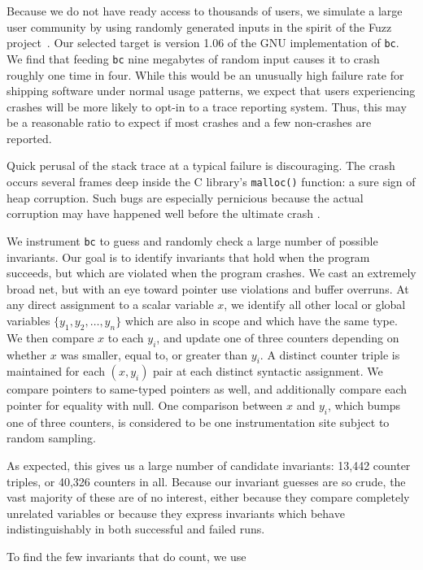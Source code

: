 Because we do not have ready access to thousands of users, we simulate
a large user community by using randomly generated inputs in the
spirit of the Fuzz project~\cite{MKLMMNS95}.  Our selected target is
version 1.06 of the GNU implementation of \texttt{bc}.  We find that
feeding \texttt{bc} nine megabytes of random input causes it to crash
roughly one time in four.  While this would be an unusually high
failure rate for shipping software under normal usage patterns, we
expect that users experiencing crashes will be more likely to opt-in
to a trace reporting system.  Thus, this may be a reasonable ratio to
expect if most crashes and a few non-crashes are reported.

Quick perusal of the stack trace at a typical failure is discouraging.
The crash occurs several frames deep inside the C library's
\texttt{malloc()} function: a sure sign of heap corruption.  Such bugs
are especially pernicious because the actual corruption may have
happened well before the ultimate crash \cite{Eisenstadt1993b}.

We instrument \texttt{bc} to guess and randomly check a large number
of possible invariants.  Our goal is to identify invariants that hold
when the program succeeds, but which are violated when the program
crashes.  We cast an extremely broad net, but with an eye toward
pointer use violations and buffer overruns.  At any direct assignment
to a scalar variable $x$, we identify all other local or global
variables $\{ y_1, y_2, \dots, y_n \}$ which are also in scope and
which have the same type.  We then compare $x$ to each $y_i$, and
update one of three counters depending on whether $x$ was smaller,
equal to, or greater than $y_i$.  A distinct counter triple is
maintained for each $(x, y_i)$ pair at each distinct syntactic
assignment.  We compare pointers to same-typed pointers as well, and
additionally compare each pointer for equality with null.  One
comparison between $x$ and $y_i$, which bumps one of three counters,
is considered to be one instrumentation site subject to random
sampling.

As expected, this gives us a large number of candidate invariants:
13,442 counter triples, or 40,326 counters in all.  Because our
invariant guesses are so crude, the vast majority of these are of no
interest, either because they compare completely unrelated variables
or because they express invariants which behave indistinguishably in
both successful and failed runs.

To find the few invariants that do count, we use 

